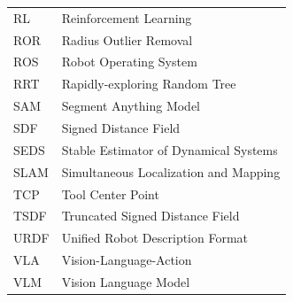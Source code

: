 \begin{longtable}{lp{5in}}
RL         & Reinforcement Learning\\
ROR        & Radius Outlier Removal\\
ROS        & Robot Operating System\\
RRT        & Rapidly-exploring Random Tree\\
SAM        & Segment Anything Model\\
SDF        & Signed Distance Field\\
SEDS       & Stable Estimator of Dynamical Systems\\
SLAM       & Simultaneous Localization and Mapping\\
TCP        & Tool Center Point\\
TSDF       & Truncated Signed Distance Field\\
URDF       & Unified Robot Description Format\\
VLA        & Vision-Language-Action\\
VLM        & Vision Language Model\\
\end{longtable}
